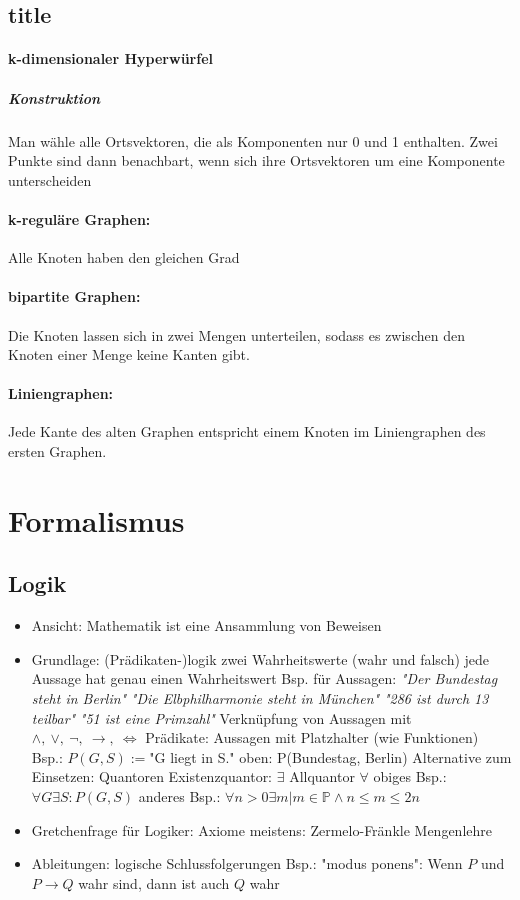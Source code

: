\documentclass[12pt]{article}
\numberwithin{equation}{subsection}
\begin{document}
	\subsection{title}
	\paragraph{k-dimensionaler Hyperwürfel}
	\subparagraph{Konstruktion}
	Man wähle alle Ortsvektoren, die als Komponenten nur 0 und 1 enthalten. Zwei Punkte sind dann benachbart, wenn sich ihre Ortsvektoren um eine Komponente unterscheiden
	\paragraph{k-reguläre Graphen:} Alle Knoten haben den gleichen Grad
	\paragraph{bipartite Graphen:} Die Knoten lassen sich in zwei Mengen unterteilen, sodass es zwischen den Knoten einer Menge keine Kanten gibt.
	\paragraph{Liniengraphen:} Jede Kante des alten Graphen entspricht einem Knoten im Liniengraphen des ersten Graphen. 
	\section{Formalismus}
	\subsection{Logik}
	\begin{itemize}
		\item Ansicht: Mathematik ist eine Ansammlung von Beweisen
		\item Grundlage: (Prädikaten-)logik
		\subitem zwei Wahrheitswerte (wahr und falsch)
		\subitem jede Aussage hat genau einen Wahrheitswert
		\subitem Bsp. für Aussagen:
		\subsubitem \textit{"Der Bundestag steht in Berlin"}
		\subsubitem \textit{"Die Elbphilharmonie steht in München"}
		\subsubitem \textit{"286 ist durch 13 teilbar"}
		\subsubitem \textit{"51 ist eine Primzahl"}
		\subitem Verknüpfung von Aussagen mit $\wedge,\ \vee,\ \neg,\ \to,\ \Leftrightarrow$
		\subitem Prädikate: Aussagen mit Platzhalter (wie Funktionen)
		\subitem Bsp.: $P(G,S):=$"G liegt in S."
		\subsubitem oben: P(Bundestag, Berlin)
		\subitem Alternative zum Einsetzen: Quantoren
		\subsubitem Existenzquantor: $\exists$
		\subsubitem Allquantor $\forall$
		\subitem obiges Bsp.: $\forall G \exists S: P(G,S)$
		\subitem anderes Bsp.: $\forall n > 0 \exists m | m \in \mathbb{P} \wedge n \leq m \leq 2n$
		\item Gretchenfrage für Logiker: Axiome meistens: Zermelo-Fränkle Mengenlehre
		\item Ableitungen: logische Schlussfolgerungen
		\subitem Bsp.: "modus ponens": 
		\subsubitem Wenn $P$ und $P\to Q$ wahr sind, dann ist auch $Q$ wahr
	
	\end{itemize}
\end{document}
